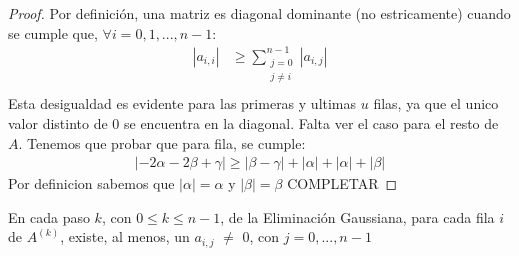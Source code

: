  \begin{proof}
    Por definición, una matriz es diagonal dominante (no estricamente) cuando se cumple que, $\forall i = 0,1,...,n-1$:
    \begin{equation*}
        \begin{aligned}
          |a_{i,i}| &\geq \sum\limits_{\substack{j=0  \\ j \neq i}}^{n-1} |a_{i,j}| \\
        \end{aligned}
    \end{equation*}
    Esta desigualdad es evidente para las primeras  y ultimas $u$ filas, ya que el unico valor distinto de 0 se encuentra en la diagonal.
    Falta ver el caso para el resto de $A$. Tenemos que probar que para fila, se cumple:
    \begin{equation*}
        \begin{aligned}
          |-2\alpha-2\beta+\gamma| \geq |\beta - \gamma| + |\alpha| + |\alpha| + |\beta|
        \end{aligned}
    \end{equation*}
    Por definicion sabemos que $|\alpha| = \alpha$ y $|\beta| = \beta$
    \newline
    COMPLETAR
  \end{proof}

  \begin{lemma}
    En cada paso $k$, con $0 \leq k \leq n-1$, de la Eliminación Gaussiana, para cada fila $i$ de $A^{(k)}$, existe, al menos, un $a_{i,j}$ $\neq$ 0, con $j = 0,..., n-1$
  \end{lemma}

